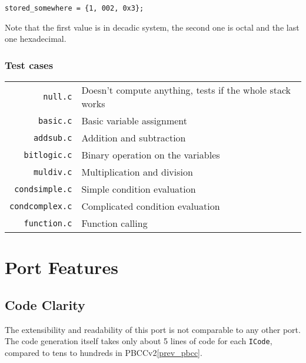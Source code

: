            \begin{center}
                \texttt{stored\_somewhere = \{1, 002, 0x3\};}
            \end{center}

            Note that the first value is in decadic system, the second one is octal and the last one hexadecimal.

        \subsection{Test cases}

            \begin{center}
            \begin{tabular}{ r | l }
                \texttt{null.c} & Doesn't compute anything, tests if the whole stack works \\
                \texttt{basic.c} & Basic variable assignment \\
                \texttt{addsub.c} & Addition and subtraction \\
                \texttt{bitlogic.c} & Binary operation on the variables \\
                \texttt{muldiv.c} & Multiplication and division \\
                \texttt{condsimple.c} & Simple condition evaluation \\
                \texttt{condcomplex.c} & Complicated condition evaluation \\
                \texttt{function.c} & Function calling \\
            \end{tabular}
            \end{center}

\chapter{Port Features}\label{features}

    \section{Code Clarity}

    The extensibility and readability of this port is not comparable to any other port. The code generation itself takes only about 5 lines of code for each \texttt{ICode}, compared to tens to hundreds in PBCCv2\ref{prev_pbcc}.

